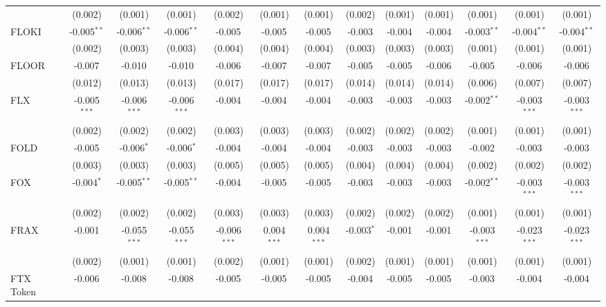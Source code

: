 \begin{table}[!htbp]
\begin{tabular}{@{\extracolsep{5pt}}lcccccccccccc}
  & (0.002) & (0.001) & (0.001) & (0.002) & (0.001) & (0.001) & (0.002) & (0.001) & (0.001) & (0.001) & (0.001) & (0.001) \\
 FLOKI & -0.005$^{**}$ & -0.006$^{**}$ & -0.006$^{**}$ & -0.005$^{}$ & -0.005$^{}$ & -0.005$^{}$ & -0.003$^{}$ & -0.004$^{}$ & -0.004$^{}$ & -0.003$^{**}$ & -0.004$^{**}$ & -0.004$^{**}$ \\
  & (0.002) & (0.003) & (0.003) & (0.004) & (0.004) & (0.004) & (0.003) & (0.003) & (0.003) & (0.001) & (0.001) & (0.001) \\
 FLOOR & -0.007$^{}$ & -0.010$^{}$ & -0.010$^{}$ & -0.006$^{}$ & -0.007$^{}$ & -0.007$^{}$ & -0.005$^{}$ & -0.005$^{}$ & -0.006$^{}$ & -0.005$^{}$ & -0.006$^{}$ & -0.006$^{}$ \\
  & (0.012) & (0.013) & (0.013) & (0.017) & (0.017) & (0.017) & (0.014) & (0.014) & (0.014) & (0.006) & (0.007) & (0.007) \\
 FLX & -0.005$^{***}$ & -0.006$^{***}$ & -0.006$^{***}$ & -0.004$^{}$ & -0.004$^{}$ & -0.004$^{}$ & -0.003$^{}$ & -0.003$^{}$ & -0.003$^{}$ & -0.002$^{**}$ & -0.003$^{***}$ & -0.003$^{***}$ \\
  & (0.002) & (0.002) & (0.002) & (0.003) & (0.003) & (0.003) & (0.002) & (0.002) & (0.002) & (0.001) & (0.001) & (0.001) \\
 FOLD & -0.005$^{}$ & -0.006$^{*}$ & -0.006$^{*}$ & -0.004$^{}$ & -0.004$^{}$ & -0.004$^{}$ & -0.003$^{}$ & -0.003$^{}$ & -0.003$^{}$ & -0.002$^{}$ & -0.003$^{}$ & -0.003$^{}$ \\
  & (0.003) & (0.003) & (0.003) & (0.005) & (0.005) & (0.005) & (0.004) & (0.004) & (0.004) & (0.002) & (0.002) & (0.002) \\
 FOX & -0.004$^{*}$ & -0.005$^{**}$ & -0.005$^{**}$ & -0.004$^{}$ & -0.005$^{}$ & -0.005$^{}$ & -0.003$^{}$ & -0.003$^{}$ & -0.003$^{}$ & -0.002$^{**}$ & -0.003$^{***}$ & -0.003$^{***}$ \\
  & (0.002) & (0.002) & (0.002) & (0.003) & (0.003) & (0.003) & (0.002) & (0.002) & (0.002) & (0.001) & (0.001) & (0.001) \\
 FRAX & -0.001$^{}$ & -0.055$^{***}$ & -0.055$^{***}$ & -0.006$^{***}$ & 0.004$^{***}$ & 0.004$^{***}$ & -0.003$^{*}$ & -0.001$^{}$ & -0.001$^{}$ & -0.003$^{***}$ & -0.023$^{***}$ & -0.023$^{***}$ \\
  & (0.002) & (0.001) & (0.001) & (0.002) & (0.001) & (0.001) & (0.002) & (0.001) & (0.001) & (0.001) & (0.001) & (0.001) \\
 FTX Token & -0.006$^{}$ & -0.008$^{}$ & -0.008$^{}$ & -0.005$^{}$ & -0.005$^{}$ & -0.005$^{}$ & -0.004$^{}$ & -0.005$^{}$ & -0.005$^{}$ & -0.003$^{}$ & -0.004$^{}$ & -0.004$^{}$ \\

\end{tabular}
\end{table}
